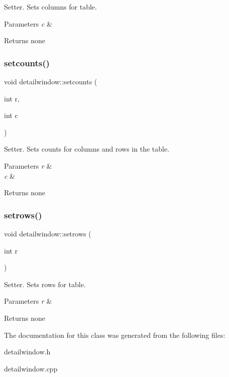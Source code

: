 Setter. Sets columns for table. 
\begin{DoxyParams}{Parameters}
{\em c} & \\
\hline
\end{DoxyParams}
\begin{DoxyReturn}{Returns}
none 
\end{DoxyReturn}
\mbox{\label{classdetailwindow_adfcea879c00c9905840988e777f809b3}} 
\subsubsection{\texorpdfstring{setcounts()}{setcounts()}}
{\footnotesize\ttfamily void detailwindow\+::setcounts (\begin{DoxyParamCaption}\item[{int}]{r,  }\item[{int}]{c }\end{DoxyParamCaption})}

Setter. Sets counts for columns and rows in the table. 
\begin{DoxyParams}{Parameters}
{\em r} & \\
\hline
{\em c} & \\
\hline
\end{DoxyParams}
\begin{DoxyReturn}{Returns}
none 
\end{DoxyReturn}
\mbox{\label{classdetailwindow_a574edec5e903abfe41cf47db896c5f20}} 
\subsubsection{\texorpdfstring{setrows()}{setrows()}}
{\footnotesize\ttfamily void detailwindow\+::setrows (\begin{DoxyParamCaption}\item[{int}]{r }\end{DoxyParamCaption})}

Setter. Sets rows for table. 
\begin{DoxyParams}{Parameters}
{\em r} & \\
\hline
\end{DoxyParams}
\begin{DoxyReturn}{Returns}
none 
\end{DoxyReturn}


The documentation for this class was generated from the following files\+:\begin{DoxyCompactItemize}
\item 
detailwindow.\+h\item 
detailwindow.\+cpp\end{DoxyCompactItemize}
